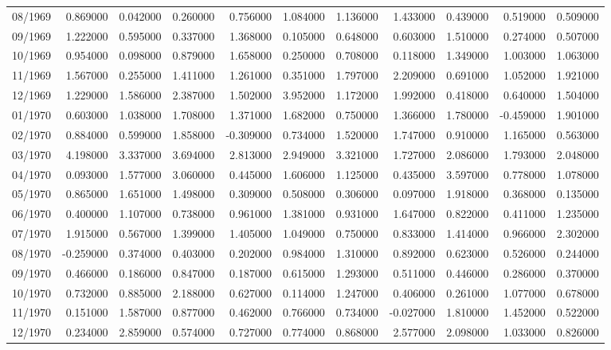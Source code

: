 \begin{tabular}{lrrrrrrrrrr}
08/1969 & 0.869000 & 0.042000 & 0.260000 & 0.756000 & 1.084000 & 1.136000 & 1.433000 & 0.439000 & 0.519000 & 0.509000 \\
09/1969 & 1.222000 & 0.595000 & 0.337000 & 1.368000 & 0.105000 & 0.648000 & 0.603000 & 1.510000 & 0.274000 & 0.507000 \\
10/1969 & 0.954000 & 0.098000 & 0.879000 & 1.658000 & 0.250000 & 0.708000 & 0.118000 & 1.349000 & 1.003000 & 1.063000 \\
11/1969 & 1.567000 & 0.255000 & 1.411000 & 1.261000 & 0.351000 & 1.797000 & 2.209000 & 0.691000 & 1.052000 & 1.921000 \\
12/1969 & 1.229000 & 1.586000 & 2.387000 & 1.502000 & 3.952000 & 1.172000 & 1.992000 & 0.418000 & 0.640000 & 1.504000 \\
01/1970 & 0.603000 & 1.038000 & 1.708000 & 1.371000 & 1.682000 & 0.750000 & 1.366000 & 1.780000 & -0.459000 & 1.901000 \\
02/1970 & 0.884000 & 0.599000 & 1.858000 & -0.309000 & 0.734000 & 1.520000 & 1.747000 & 0.910000 & 1.165000 & 0.563000 \\
03/1970 & 4.198000 & 3.337000 & 3.694000 & 2.813000 & 2.949000 & 3.321000 & 1.727000 & 2.086000 & 1.793000 & 2.048000 \\
04/1970 & 0.093000 & 1.577000 & 3.060000 & 0.445000 & 1.606000 & 1.125000 & 0.435000 & 3.597000 & 0.778000 & 1.078000 \\
05/1970 & 0.865000 & 1.651000 & 1.498000 & 0.309000 & 0.508000 & 0.306000 & 0.097000 & 1.918000 & 0.368000 & 0.135000 \\
06/1970 & 0.400000 & 1.107000 & 0.738000 & 0.961000 & 1.381000 & 0.931000 & 1.647000 & 0.822000 & 0.411000 & 1.235000 \\
07/1970 & 1.915000 & 0.567000 & 1.399000 & 1.405000 & 1.049000 & 0.750000 & 0.833000 & 1.414000 & 0.966000 & 2.302000 \\
08/1970 & -0.259000 & 0.374000 & 0.403000 & 0.202000 & 0.984000 & 1.310000 & 0.892000 & 0.623000 & 0.526000 & 0.244000 \\
09/1970 & 0.466000 & 0.186000 & 0.847000 & 0.187000 & 0.615000 & 1.293000 & 0.511000 & 0.446000 & 0.286000 & 0.370000 \\
10/1970 & 0.732000 & 0.885000 & 2.188000 & 0.627000 & 0.114000 & 1.247000 & 0.406000 & 0.261000 & 1.077000 & 0.678000 \\
11/1970 & 0.151000 & 1.587000 & 0.877000 & 0.462000 & 0.766000 & 0.734000 & -0.027000 & 1.810000 & 1.452000 & 0.522000 \\
12/1970 & 0.234000 & 2.859000 & 0.574000 & 0.727000 & 0.774000 & 0.868000 & 2.577000 & 2.098000 & 1.033000 & 0.826000 \\

\end{tabular}
